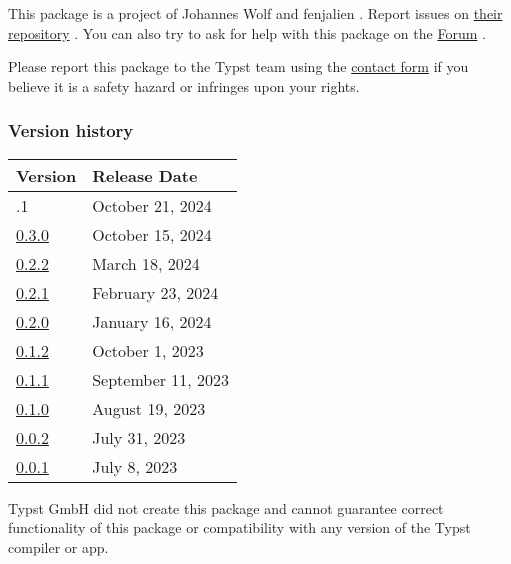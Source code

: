 This package is a project of Johannes Wolf and fenjalien . Report issues
on \href{https://github.com/cetz-package/cetz}{their repository} . You
can also try to ask for help with this package on the
\href{https://forum.typst.app}{Forum} .

Please report this package to the Typst team using the
\href{https://typst.app/contact}{contact form} if you believe it is a
safety hazard or infringes upon your rights.

\label{versions}
\subsubsection{Version history}\label{version-history}

\begin{longtable}[]{@{}ll@{}}
\toprule\noalign{}
Version & Release Date \\
\midrule\noalign{}
\endhead
\bottomrule\noalign{}
\endlastfoot
0.3.1 & October 21, 2024 \\
\href{https://typst.app/universe/package/cetz/0.3.0/}{0.3.0} & October
15, 2024 \\
\href{https://typst.app/universe/package/cetz/0.2.2/}{0.2.2} & March 18,
2024 \\
\href{https://typst.app/universe/package/cetz/0.2.1/}{0.2.1} & February
23, 2024 \\
\href{https://typst.app/universe/package/cetz/0.2.0/}{0.2.0} & January
16, 2024 \\
\href{https://typst.app/universe/package/cetz/0.1.2/}{0.1.2} & October
1, 2023 \\
\href{https://typst.app/universe/package/cetz/0.1.1/}{0.1.1} & September
11, 2023 \\
\href{https://typst.app/universe/package/cetz/0.1.0/}{0.1.0} & August
19, 2023 \\
\href{https://typst.app/universe/package/cetz/0.0.2/}{0.0.2} & July 31,
2023 \\
\href{https://typst.app/universe/package/cetz/0.0.1/}{0.0.1} & July 8,
2023 \\
\end{longtable}

Typst GmbH did not create this package and cannot guarantee correct
functionality of this package or compatibility with any version of the
Typst compiler or app.

